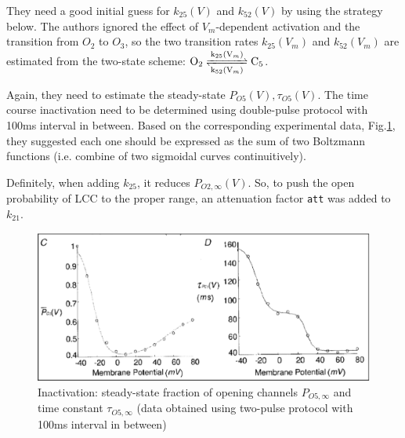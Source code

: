 \begin{enumerate}
They need a good initial guess for $k_{25}(V)$ and $k_{52}(V)$ by using
the strategy below. The authors ignored the effect of $V_m$-dependent activation
and the transition from $O_2$ to $O_3$, so the two transition rates
$k_{25}(V_m)$ and $k_{52}(V_m)$ are estimated from the two-state scheme:
 $\ce{O2 <=>[k_{25}(V_m)][k_{52}(V_m)] C5}$.

Again, they need to estimate the steady-state $P_{O5}(V), \tau_{O5}(V)$. The
time course inactivation need to be determined using double-pulse protocol with
100ms interval in between. Based on the corresponding experimental data,
Fig.\ref{fig:Sun_inactivation}, they suggested each one should be expressed as
the sum of two Boltzmann functions (i.e. combine of two sigmoidal curves
continuitively). 


Definitely, when adding $k_{25}$, it reduces $P_{O2,\infty}(V)$. So, to push the
open probability of LCC to the proper range, an attenuation factor \verb!att!
was added to $k_{21}$.

\begin{figure}[hbt]
 \centerline{\includegraphics[height=5cm]{./images/Sun_inactivation.eps}}
\caption{Inactivation: steady-state fraction of opening channels $P_{O5,\infty}$
and time constant $\tau_{O5,\infty}$ (data obtained using two-pulse protocol
with 100ms interval in between)}
\label{fig:Sun_inactivation}
\end{figure}


\end{enumerate}
